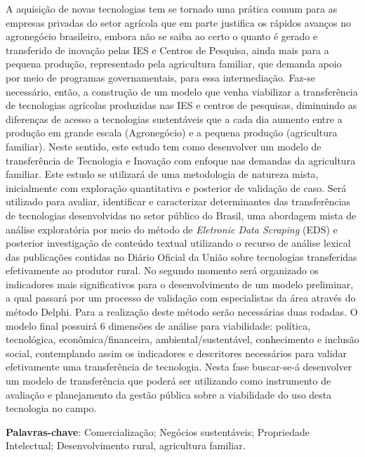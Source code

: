 \setlength{\absparsep}{18pt} %
\begin{resumo}




A aquisição de novas tecnologias tem se tornado uma prática comum para as empresas privadas do setor agrícola que em parte justifica os rápidos avanços no agronegócio brasileiro, embora não se saiba ao certo o quanto é gerado e transferido de inovação pelas IES e Centros de Pesquisa, ainda mais para a pequena produção, representado pela agricultura familiar, que demanda apoio por meio de programas governamentais, para essa intermediação. Faz-se necessário, então, a construção de um modelo que venha viabilizar a transferência de tecnologias agrícolas produzidas nas IES e centros de pesquisas, diminuindo as diferenças de acesso a tecnologias sustentáveis que a cada dia aumento entre a produção em grande escala (Agronegócio) e a pequena produção (agricultura familiar). Neste sentido, este estudo tem como desenvolver um modelo de transferência de Tecnologia e Inovação com enfoque nas demandas da agricultura familiar. Este estudo se utilizará de uma metodologia de natureza mista, inicialmente com exploração quantitativa e posterior de validação de caso. Será utilizado para avaliar, identificar e caracterizar determinantes das transferências de tecnologias desenvolvidas no setor público do Brasil, uma abordagem mista de análise exploratória por meio do método de \textit{Eletronic Data Scraping} (EDS) e posterior investigação de conteúdo textual utilizando o recurso de análise lexical das publicações contidas no Diário Oficial da União sobre tecnologias transferidas efetivamente ao produtor rural. No segundo momento será organizado os indicadores mais significativos para o desenvolvimento de um modelo preliminar, a qual passará por um processo de validação com especialistas da área através do método Delphi. Para a realização deste método serão necessárias duas rodadas. O modelo final possuirá 6 dimensões de análise para viabilidade: política, tecnológica, econômica/financeira, ambiental/sustentável, conhecimento e inclusão social, contemplando assim os indicadores e descritores necessários para validar efetivamente uma transferência de tecnologia. Nesta fase buscar-se-á desenvolver um modelo de transferência que poderá ser utilizando como instrumento de avaliação e planejamento da gestão pública sobre a viabilidade do uso desta tecnologia no campo.

\textbf{Palavras-chave}: Comercialização; Negócios sustentáveis; Propriedade Intelectual; Desenvolvimento rural, agricultura familiar.
\end{resumo}